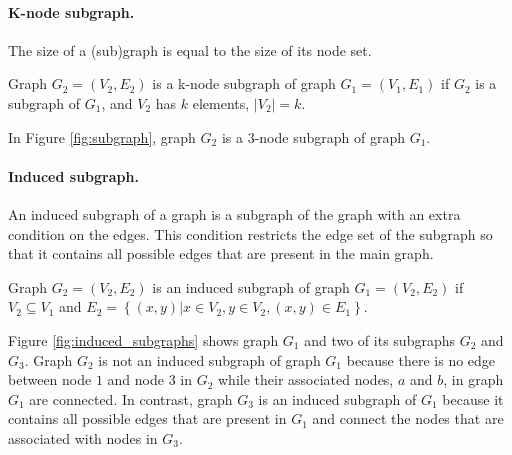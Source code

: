 \paragraph{K-node subgraph.}
The size of a (sub)graph is equal to the size of its node set. 

\begin{definition}
Graph $G_2 = \left( V_2 , E_2 \right)$ is a k-node subgraph of graph $G_1 = \left( V_1, E_1 \right)$ if $G_2$ is a subgraph of $G_1$, and $V_2$ has $k$ elements, $|V_2|=k$. 
\end{definition}

In Figure \ref{fig:subgraph}, graph $G_2$ is a 3-node subgraph of graph $G_1$. 

\paragraph{Induced subgraph.} 
An induced subgraph of a graph is a subgraph of the graph with an extra condition on the edges.  
This condition restricts the edge set of the subgraph so that it contains all possible edges that are present in the main graph.

\begin{definition} 
Graph $G_2 = (V_2, E_2)$ is an induced subgraph of graph $G_1 = (V_2, E_2)$ if $V_2 \subseteq V_1$ and 
$E_2 = \left\{ (x,y)| x \in V_2, y \in V_2, (x,y) \in E_1   \right\}$.
\end{definition}

Figure \ref{fig:induced_subgraphs} shows graph $G_1$ and two of its subgraphs $G_2$ and $G_3$.  
Graph $G_2$ is not an induced subgraph of graph $G_1$ because there is no edge between node $1$ and node $3$ in $G_2$ while their associated nodes, $a$ and $b$, in graph $G_1$ are connected. 
In contrast, graph $G_3$ is an induced subgraph of $G_1$ because it contains all possible edges that are present in $G_1$ and connect the nodes that are associated with nodes in $G_3$.  

